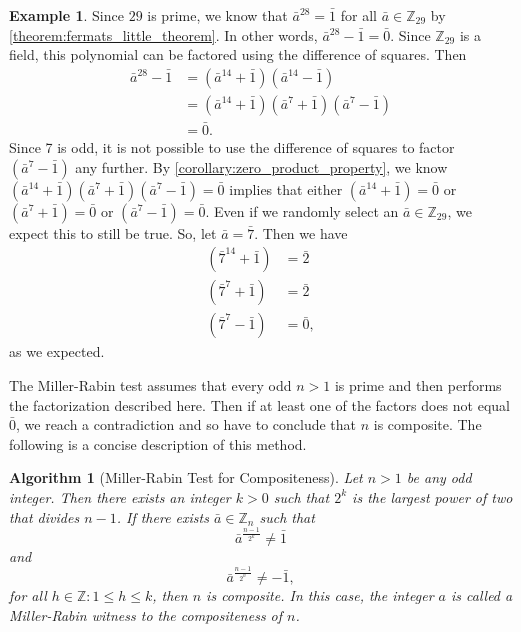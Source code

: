 \documentclass[10pt, titlepage]{amsart}
\newcommand\Z{{\mathbb Z}}
\newtheorem{algorithm}{Algorithm}[subsection]
\theoremstyle{definition}
\newtheorem{example}{Example}[subsection]
\begin{document}
	\begin{example}\label{example:miller-rabin_prime_modulus}
		Since $29$ is prime, we know that $\bar{a}^{28} = \bar{1}$ for all $\bar{a} \in \Z_{29}$ by \cref{theorem:fermats_little_theorem}. 
		In other words, $\bar{a}^{28}-\bar{1}=\bar{0}$.
		Since $\Z_{29}$ is a field, this polynomial can be factored using the difference of squares.
		Then
		\begin{align*}
		\bar{a}^{28}-\bar{1}
		&= (\bar{a}^{14}+\bar{1})(\bar{a}^{14}-\bar{1}) \\
		&= (\bar{a}^{14}+\bar{1})(\bar{a}^{7}+\bar{1})(\bar{a}^{7}-\bar{1}) \\
		&= \bar{0}.
		\end{align*}
		Since 7 is odd, it is not possible to use the difference of squares to factor $(\bar{a}^{7}-\bar{1})$ any further.
		By \cref{corollary:zero_product_property}, we know $(\bar{a}^{14}+\bar{1})(\bar{a}^{7}+\bar{1})(\bar{a}^{7}-\bar{1}) = \bar{0}$ implies that either $(\bar{a}^{14}+\bar{1})=\bar{0}$ or $(\bar{a}^{7}+\bar{1})=\bar{0}$ or $(\bar{a}^{7}-\bar{1})=\bar{0}$.
		Even if we randomly select an $\bar{a} \in \Z_{29}$, we expect this to still be true.
		So, let $\bar{a} = \bar{7}$.
		Then we have
		\begin{align*}
		(\bar{7}^{14}+\bar{1})&=\bar{2} \\
		(\bar{7}^{7}+\bar{1})&=\bar{2} \\
		(\bar{7}^{7}-\bar{1})&=\bar{0},
		\end{align*}
		as we expected.	
	\end{example}
			
	The Miller-Rabin test assumes that every odd $n>1$ is prime and then performs the factorization described here. Then if at least one of the factors does not equal $\bar{0}$, we reach a contradiction and so have to conclude that $n$ is composite.
	The following is a concise description of this method.


	\begin{algorithm}[Miller-Rabin Test for Compositeness]\label{algorithm:miller-rabin}
		Let $n > 1$ be any odd integer. 
		Then there exists an integer $k > 0$ such that $2^k$ is the largest power of two that divides $n-1$.
		If there exists $\bar{a} \in \Z_n$ such that  
		$$\bar{a}^{\frac{n-1}{2^k}} \neq \bar{1}$$ and 
		$$\bar{a}^{\frac{n-1}{2^h}} \neq -\bar{1},$$ 
		for all $h \in \Z : 1 \leq h \leq k$, then $n$ is composite. 
		In this case, the integer $a$ is called a Miller-Rabin witness to the compositeness of $n$.
	\end{algorithm}
	
\end{document}

